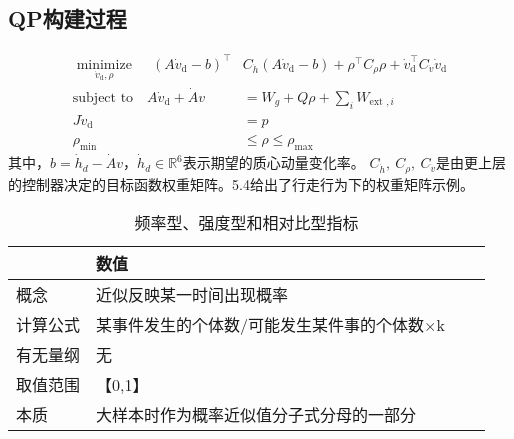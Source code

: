\subsection{QP构建过程}
\begin{equation}
    \label{equ:qp_control}
    \begin{aligned}
       \underset{{{{\dot{v}}}_{\text{d}}},\rho }{\mathop{\operatorname{minimize}}}\,\quad {{\left( A{{{\dot{v}}}_{\text{d}}}-b \right)}^{\top }}&{{C}_{{\dot{h}}}}\left( A{{{\dot{v}}}_{\text{d}}}-b \right)+{{\rho }^{\top }}{{C}_{\rho }}\rho +\dot{v}_{\text{d}}^{\top }{{C}_{{\dot{v}}}}{{{\dot{v}}}_{\text{d}}} \\ 
        \text{subject to}\quad A{{{\dot{v}}}_{\text{d}}}+\dot{A}v&={{W}_{g}}+Q\rho +\sum\limits_{i}{{{W}_{\text{ext },i}}} \\ 
        J{{{\dot{v}}}_{\text{d}}}&=p \\ 
        {{\rho }_{\min }}&\le \rho \le {{\rho }_{\max }} 
      \end{aligned}
\end{equation}
其中，$b={{\dot{h}}_{d}}-\dot{A}v$，${{\dot{h}}_{d}}\in {{\mathbb{R}}^{6}}$表示期望的质心动量变化率。
${{C}_{{\dot{h}}}},\ {{C}_{\rho }},\ {{C}_{{\dot{v}}}}$是由更上层的控制器决定的目标函数权重矩阵。5.4给出了行走行为下的权重矩阵示例。
\begin{table}[!htbp]
	\centering
	\caption{频率型、强度型和相对比型指标}
	\begin{tabular}{lp{3cm}p{3cm}p{4cm}}
		\toprule  %
		\fangsong{参数符号}   &数值  \\
		\midrule  %
		概念    & 近似反映某一时间出现概率\\
		计算公式 &  某事件发生的个体数/可能发生某件事的个体数$\times$k\\
		有无量纲 &无 \\
		取值范围 &【0,1】\\
		本质   & 大样本时作为概率近似值分子式分母的一部分\\
		\bottomrule %
	\end{tabular}
\end{table}


